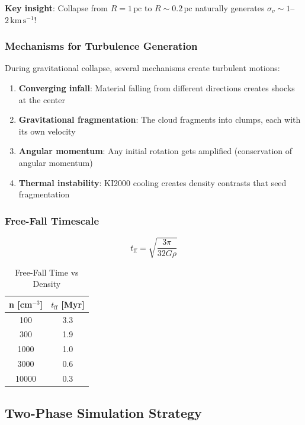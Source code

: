 \documentclass[11pt,a4paper]{article}
\newcommand{\kms}{\,\mathrm{km\,s^{-1}}}
\newcommand{\pc}{\,\mathrm{pc}}
\begin{document}
\textbf{Key insight}: Collapse from $R = 1\pc$ to $R \sim 0.2\pc$ naturally
generates $\sigma_v \sim 1$--$2\kms$!

\subsubsection{Mechanisms for Turbulence Generation}

During gravitational collapse, several mechanisms create turbulent motions:
\begin{enumerate}
    \item \textbf{Converging infall}: Material falling from different directions
          creates shocks at the center
    \item \textbf{Gravitational fragmentation}: The cloud fragments into clumps,
          each with its own velocity
    \item \textbf{Angular momentum}: Any initial rotation gets amplified
          (conservation of angular momentum)
    \item \textbf{Thermal instability}: KI2000 cooling creates density contrasts
          that seed fragmentation
\end{enumerate}

\subsubsection{Free-Fall Timescale}

\begin{equation}
    t_\mathrm{ff} = \sqrt{\frac{3\pi}{32 G \rho}}
\end{equation}

\begin{table}[h]
\centering
\caption{Free-Fall Time vs Density}
\begin{tabular}{cc}
\toprule
\textbf{n [cm$^{-3}$]} & \textbf{$t_\mathrm{ff}$ [Myr]} \\
\midrule
100 & 3.3 \\
300 & 1.9 \\
1000 & 1.0 \\
3000 & 0.6 \\
10000 & 0.3 \\
\bottomrule
\end{tabular}
\end{table}

\subsection{Two-Phase Simulation Strategy}
\end{document}
